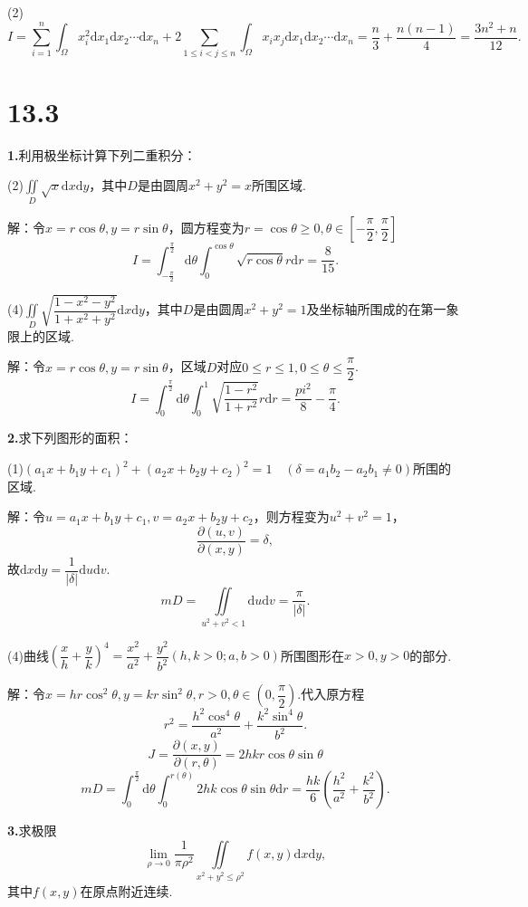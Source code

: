\documentclass[12pt, a4paper]{article}
\newcommand{\dif}{\mathrm{d}}
\begin{document}
(2)
\[I = \sum_{i = 1}^{n} \int_\Omega x_i^2 \dif x_1 \dif x_2 \cdots \dif x_n + 2\sum_{1 \leq i < j \leq n} \int_\Omega x_ix_j \dif x_1 \dif x_2 \cdots \dif x_n = \frac{n}{3} + \frac{n(n - 1)}{4} = \frac{3n^2 + n}{12}.\]

\section*{13.3}
\textbf{1.}利用极坐标计算下列二重积分：

(2)\(\iint\limits_D \sqrt{x} \dif x \dif y\)，其中\(D\)是由圆周\(x^2 + y^2 = x\)所围区域.

解：令\(x = r \cos\theta, y = r \sin\theta\)，圆方程变为\(r = \cos\theta \geq 0, \theta \in [-\dfrac{\pi}{2}, \dfrac{\pi}{2}]\)
\[I = \int_{-\frac{\pi}{2}}^{\frac{\pi}{2}} \dif \theta \int_{0}^{\cos \theta} \sqrt{r \cos\theta} r \dif r = \frac{8}{15}.\]

(4)\(\iint\limits_D \sqrt{\dfrac{1 - x^2 - y^2}{1 + x^2 + y^2}} \dif x \dif y\)，其中\(D\)是由圆周\(x^2 + y^2 = 1\)及坐标轴所围成的在第一象限上的区域.

解：令\(x = r \cos\theta, y = r \sin\theta\)，区域\(D\)对应\(0 \leq r \leq 1, 0 \leq \theta \leq \dfrac{\pi}{2}\).
\[I = \int_{0}^{\frac{\pi}{2}} \dif \theta \int_0^1 \sqrt{\frac{1 - r^2}{1 + r^2}} r \dif r = \frac{pi^2}{8} - \frac{\pi}{4}.\]

\textbf{2.}求下列图形的面积：

(1)\((a_1x + b_1y + c_1)^2 + (a_2x + b_2y + c_2)^2 = 1 \quad (\delta = a_1b_2 - a_2b_1 \neq 0)\)所围的区域.

解：令\(u = a_1x + b_1y + c_1, v = a_2x + b_2y + c_2\)，则方程变为\(u^2 + v^2 = 1\)，
\[\frac{\partial(u, v)}{\partial(x, y)} = \delta,\]
故\(\dif x \dif y = \dfrac{1}{|\delta|} \dif u \dif v\).
\[mD = \iint\limits_{u^2 + v^2 < 1} \dif u \dif v = \frac{\pi}{|\delta|}.\]

(4)曲线\(\left(\dfrac{x}{h} + \dfrac{y}{k}\right)^4 = \dfrac{x^2}{a^2} + \dfrac{y^2}{b^2}(h, k > 0; a, b > 0)\)所围图形在\(x > 0, y > 0\)的部分.

解：令\(x = hr\cos^2\theta, y = kr\sin^2\theta, r > 0, \theta \in \left(0, \dfrac{\pi}{2}\right)\).代入原方程
\[r^2 = \frac{h^2\cos^4\theta}{a^2} + \frac{k^2\sin^4\theta}{b^2}.\]
\[J = \frac{\partial(x, y)}{\partial(r, \theta)} = 2hkr\cos\theta\sin\theta\]
\[mD = \int_{0}^{\frac{\pi}{2}} \dif \theta \int_{0}^{r(\theta)} 2hk\cos\theta\sin\theta \dif r = \frac{hk}{6}\left(\frac{h^2}{a^2} + \frac{k^2}{b^2}\right).\]


\textbf{3.}求极限
\[\lim_{\rho \to 0} \frac{1}{\pi\rho^2} \iint\limits_{x^2 + y^2 \leq \rho^2} f(x, y) \dif x \dif y,\]
其中\(f(x, y)\)在原点附近连续.
\end{document}
